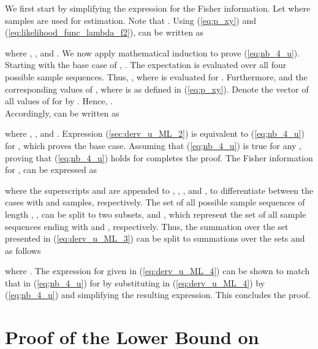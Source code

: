 \documentclass[11pt,draftclsnofoot,journal,onecolumn]{IEEEtran}
\begin{document}
\begin{IEEEproof} We first start by simplifying the expression for the Fisher information. Let  where  samples are used for estimation. Note that . Using (\ref{eq:p_xy}) and (\ref{eq:likelihood_func_lambda_f2}),  can be written as

where , , and . We now apply mathematical induction to prove (\ref{eq;nb_4_u}). Starting with the base case of , . The expectation is evaluated over all four possible sample sequences. Thus, , where  is  evaluated for . Furthermore,  and the corresponding values of , where  is as defined in (\ref{eq:p_xy}). Denote the vector of all values of  for  by . Hence,  . \\Accordingly,  can be written as

where  , , and  . Expression (\ref{sec:derv_u_ML_2}) is equivalent to (\ref{eq;nb_4_u}) for , which proves the base case. Assuming that (\ref{eq;nb_4_u}) is true for any , proving that (\ref{eq;nb_4_u}) holds for  completes the proof. The Fisher information for , can be expressed as

where the superscripts  and  are appended to , , , and , to differentiate between the cases with  and  samples, respectively. The set of all possible sample sequences of length , , can be split to two subsets,  and , which represent the set of all sample sequences ending with  and , respectively. Thus, the summation over the set  presented in (\ref{eq:derv_u_ML_3}) can be split to summations over the sets  and  as follows

where . The expression for  given in (\ref{eq:derv_u_ML_4}) can be shown to match that in (\ref{eq;nb_4_u}) for  by substituting  in (\ref{eq:derv_u_ML_4}) by (\ref{eq;nb_4_u}) and simplifying the resulting expression. This concludes the proof.
\end{IEEEproof}

\section{Proof of the Lower Bound on }
\label{sec:math_ind_lf}
\end{document}
